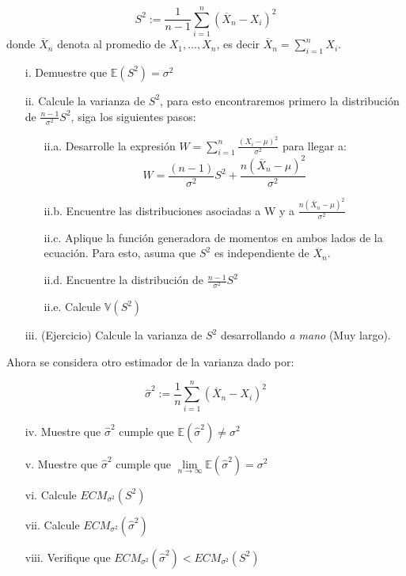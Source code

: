 \begin{enumerate}
\[S^2 := \frac{1}{n-1}\sum\limits_{i=1}^{n}(\overline{X}_n-X_i)^2\]
donde $\overline{X}_n$ denota al promedio de $X_1,..., X_n$, es decir  $\overline{X}_n = \sum\limits_{i=1}^{n}X_i$. 
\begin{enumerate}
    \item [i.] Demuestre que $\mathbb{E}(S^2) = \sigma^2$ 
    \item [ii.] Calcule la varianza de $S^2$, para esto encontraremos primero la distribución de $\frac{n-1}{\sigma^2}S^2$, siga los siguientes pasos:
    \begin{enumerate}
        \item [ii.a.] Desarrolle la expresión $W=\sum\limits_{i=1}^{n}\frac{(X_i-\mu)^2}{\sigma^2}$ para llegar a:
        \[W = \frac{(n-1)}{\sigma^2}S^2  + \frac{n(\overline{X}_n-\mu)^2}{\sigma^2} \]
        \item [ii.b.] Encuentre las distribuciones asociadas a W y a $\frac{n(\overline{X}_n-\mu)^2}{\sigma^2} $
        \item [ii.c.] Aplique la función generadora de momentos en ambos lados de la ecuación. Para esto, asuma que $S^2$ es independiente de $\overline{X}_n$.
        \item [ii.d.] Encuentre la distribución de $\frac{n-1}{\sigma^2}S^2$
        \item [ii.e.] Calcule $\mathbb{V}(S^2)$
    \end{enumerate}
    \item [iii.] (Ejercicio) Calcule la varianza de $S^2$ desarrollando \textit{a mano} (Muy largo). 
\end{enumerate}


Ahora se considera otro estimador de la varianza dado por:

\[\hat{\sigma}^2 := \frac{1}{n}\sum\limits_{i=1}^{n}(\overline{X}_n - X_i)^2    \]

\begin{enumerate}
    \item [iv.] Muestre que $\hat{\sigma}^2$ cumple que $\mathbb{E}(\hat{\sigma}^2) \neq \sigma^2$ 
    \item [v.] Muestre que $\hat{\sigma}^2$ cumple que $\lim\limits_{n\rightarrow \infty} \mathbb{E}(\hat{\sigma}^2) = \sigma^2$
\end{enumerate}

\begin{enumerate}
    \item [vi.] Calcule $ECM_{\sigma^2}(S^2)$
    \item [vii.] Calcule $ECM_{\sigma^2}(\hat{\sigma}^2) $
    \item [viii.] Verifique que $ECM_{\sigma^2}(\hat{\sigma}^2) < ECM_{\sigma^2}(S^2)$
\end{enumerate}


\end{enumerate}
